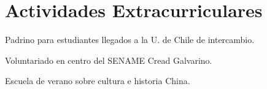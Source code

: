 \section{Actividades Extracurriculares \faStar}
Padrino para estudiantes llegados a la U. de Chile de intercambio.
\sectionsep

Voluntariado en centro del SENAME Cread Galvarino.
\sectionsep

Escuela de verano sobre cultura e historia China.
\sectionsep